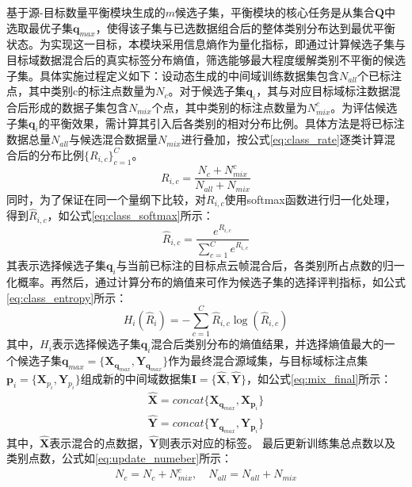     基于源-目标数量平衡模块生成的$m$候选子集，平衡模块的核心任务是从集合$\mathbf{Q}$中选取最优子集$\mathbf{q}_{max}$，使得该子集与已选数据组合后的整体类别分布达到最优平衡状态。为实现这一目标，本模块采用信息熵作为量化指标，即通过计算候选子集与目标域数据混合后的真实标签分布熵值，筛选能够最大程度缓解类别不平衡的候选子集。具体实施过程定义如下：设动态生成的中间域训练数据集包含$N_{all}$个已标注点，其中类别c的标注点数量为$N_c$。对于候选子集$\mathbf{q}_i$，其与对应目标域标注数据混合后形成的数据子集包含$N_{mix}$个点，其中类别的标注点数量为$N_{mix}^c$。为评估候选子集$\mathbf{q}_i$的平衡效果，需计算其引入后各类别的相对分布比例。具体方法是将已标注数据总量$N_{all}$与候选混合数据量$N_{mix}$进行叠加，按公式\eqref{eq:class_rate}逐类计算混合后的分布比例$\{R_{i,c}\}^C_{c=1}$。%
    \begin{equation}
        \label{eq:class_rate}
        R_{i,c} = \frac{N_c+N^c_{mix}}{N_{all}+N_{mix}}
    \end{equation}
    同时，为了保证在同一个量纲下比较，对$R_{i,c}$使用softmax函数进行归一化处理，得到$\hat{R}_{i,c}$，如公式\eqref{eq:class_softmax}所示：
    \begin{equation}
        \label{eq:class_softmax}
        \hat{R}_{i,c}=\frac{e^{R_{i,c}}}{\sum^C_{c=1}e^{R_{i,c}}}
    \end{equation}
    其表示选择候选子集$\mathbf{q}_i$与当前已标注的目标点云帧混合后，各类别所占点数的归一化概率。再然后，通过计算分布的熵值来可作为候选子集的选择评判指标，如公式\eqref{eq:class_entropy}所示：
    \begin{equation}
        \label{eq:class_entropy}
        H_i(\hat{R}_{i})=-\sum_{c=1}^{C} \hat{R}_{i,c}\log(\hat{R}_{i,c})
    \end{equation}
    其中，$H_i$表示选择候选子集$\mathbf{q}_i$混合后类别分布的熵值结果，并选择熵值最大的一个候选子集$\mathbf{q}_{max}=\{\mathbf{X}_{\mathbf{q}_{max}},\mathbf{Y}_{\mathbf{q}_{max}}\}$作为最终混合源域集，与目标域标注点集$\mathbf{p}_i=\{\mathbf{X}_{p_i},\mathbf{Y}_{p_i}\}$组成新的中间域数据集$\mathbf{I}=\{\mathbf{\hat{X},\hat{Y}}\}$，如公式\eqref{eq:mix_final}所示：
    \begin{equation}
        \label{eq:mix_final}
        \begin{aligned}
            \mathbf{\hat{X}}=concat\{\mathbf{X}_{\mathbf{q}_{max}},\mathbf{X}_{\mathbf{p}_i}\}
            \\
        \mathbf{\hat{Y}}=concat\{\mathbf{Y}_{\mathbf{q}_{max}},\mathbf{Y}_{\mathbf{p}_i}\}
        \end{aligned}
    \end{equation}
    其中，$\mathbf{\hat{X}}$表示混合的点数据，$\mathbf{\hat{Y}}$则表示对应的标签。%
    最后更新训练集总点数以及类别点数，公式如\eqref{eq:update_numeber}所示：
    \begin{equation}
        \label{eq:update_numeber}
        \begin{aligned}
            N_c=N_c+N^c_{mix}, \quad
            N_{all}=N_{all}+N_{mix}
        \end{aligned}
    \end{equation}
    
